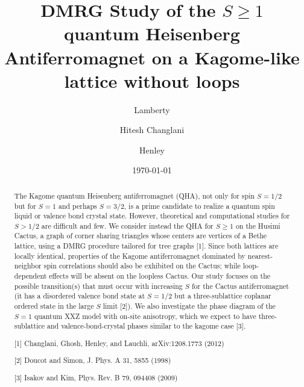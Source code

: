 \documentclass[aps, superscriptaddress]{revtex4-1}
\begin{document}
\title{DMRG Study of the $S\ge 1$ quantum Heisenberg Antiferromagnet on a Kagome-like lattice without loops}
\date{\today}

\author{ Lamberty}
\author{Hitesh Changlani}
\author{ Henley}

\begin{abstract}
The Kagome quantum Heisenberg antiferromagnet (QHA), not only for spin $S=1/2$ but for $S=1$ and perhaps $S=3/2$, is a prime candidate to realize a quantum spin liquid or valence bond crystal state. However, theoretical and computational studies for $S>1/2$ are difficult and few. We consider instead the QHA for $S\ge1$ on the Husimi Cactus, a graph of corner sharing triangles whose centers are vertices of a Bethe lattice, using a DMRG procedure tailored for tree graphs [1]. Since both lattices are locally identical, properties of the Kagome antiferromagnet dominated by nearest-neighbor spin correlations should also be exhibited on the Cactus; while loop-dependent effects will be absent on the loopless Cactus. Our study focuses on the possible transition(s) that must occur with increasing $S$ for the Cactus antiferromagnet (it has a disordered valence bond state at $S=1/2$ but a three-sublattice coplanar ordered state in the large $S$ limit [2]). We also investigate the phase diagram of the $S=1$ quantum XXZ model with on-site anisotropy, which we expect to have three-sublattice and valence-bond-crystal phases similar to the kagome case [3].

[1] Changlani, Ghosh, Henley, and Lauchli, arXiv:1208.1773 (2012)

[2] Doucot and Simon, J. Phys. A 31, 5855 (1998)

[3] Isakov and Kim, Phys. Rev. B 79, 094408 (2009)
\end{abstract}
\maketitle
\end{document}
